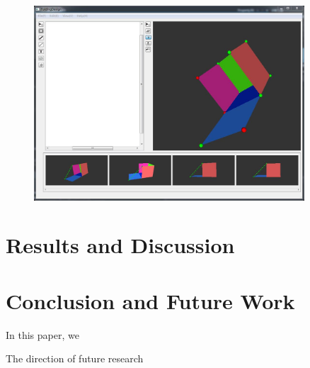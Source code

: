 \documentclass[submission]{gmp2018}
\begin{document}
\begin{figure}
	\centering
	\includegraphics[width=0.9\textwidth]{images/ui.jpg}
	\caption{}
	\label{fig:interface}
\end{figure}


\section{Results and Discussion}\label{sec:result}
{\color{red}{show every step of results and analysis}}


\section{Conclusion and Future Work}\label{sec:conclusion}
In this paper, we 

The direction of future research



\end{document}
